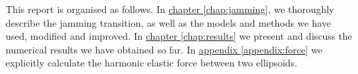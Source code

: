 \documentclass[class=report, float=false, crop=false]{standalone}
\begin{document}
This report is organised as follows. In \hyperref[chap:jamming]{chapter \ref{chap:jamming}}, we thoroughly describe the jamming transition, as well as the models and methods we have used, modified and improved. In \hyperref[chap:results]{chapter \ref{chap:results}} we present and discuss the numerical results we have obtained so far. In \hyperref[appendix:force]{appendix \ref{appendix:force}} we explicitly calculate the harmonic elastic force between two ellipsoids.\\


% 
\end{document}
